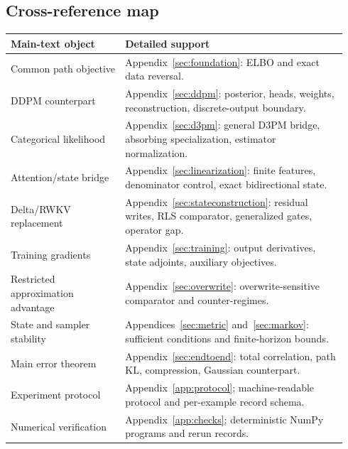 \documentclass{article}
\theoremstyle{remark}\newtheorem{remark}[theorem]{Remark}
\begin{document}
\subsection{Cross-reference map}
\begin{longtable}{@{}p{0.32\linewidth}p{0.62\linewidth}@{}}
\toprule
Main-text object & Detailed support\\
\midrule\endhead
Common path objective & Appendix~\ref{sec:foundation}: ELBO and exact data reversal.\\
DDPM counterpart & Appendix~\ref{sec:ddpm}: posterior, heads, weights, reconstruction, discrete-output boundary.\\
Categorical likelihood & Appendix~\ref{sec:d3pm}: general D3PM bridge, absorbing specialization, estimator normalization.\\
Attention/state bridge & Appendix~\ref{sec:linearization}: finite features, denominator control, exact bidirectional state.\\
Delta/RWKV replacement & Appendix~\ref{sec:stateconstruction}: residual writes, RLS comparator, generalized gates, operator gap.\\
Training gradients & Appendix~\ref{sec:training}: output derivatives, state adjoints, auxiliary objectives.\\
Restricted approximation advantage & Appendix~\ref{sec:overwrite}: overwrite-sensitive comparator and counter-regimes.\\
State and sampler stability & Appendices~\ref{sec:metric} and~\ref{sec:markov}: sufficient conditions and finite-horizon bounds.\\
Main error theorem & Appendix~\ref{sec:endtoend}: total correlation, path KL, compression, Gaussian counterpart.\\
Experiment protocol & Appendix~\ref{app:protocol}; machine-readable protocol and per-example record schema.\\
Numerical verification & Appendix~\ref{app:checks}; deterministic NumPy programs and rerun records.\\
\bottomrule
\end{longtable}
\end{document}
